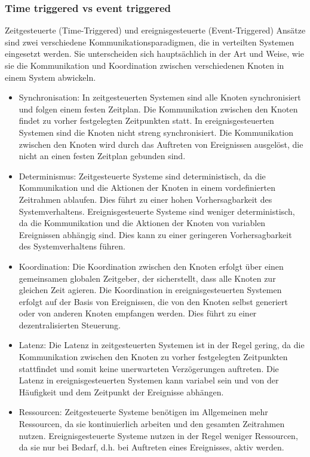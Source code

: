 \documentclass[../vs-script-first-v01.tex]{subfiles}
\begin{document}
\subsubsection{Time triggered vs event triggered}
Zeitgesteuerte (Time-Triggered) und ereignisgesteuerte (Event-Triggered) Ansätze sind zwei verschiedene Kommunikationsparadigmen, die in verteilten Systemen eingesetzt werden. Sie unterscheiden sich hauptsächlich in der Art und Weise, wie sie die Kommunikation und Koordination zwischen verschiedenen Knoten in einem System abwickeln.
\begin{itemize}
\item Synchronisation: In zeitgesteuerten Systemen sind alle Knoten synchronisiert und folgen einem festen Zeitplan. Die Kommunikation zwischen den Knoten findet zu vorher festgelegten Zeitpunkten statt. In ereignisgesteuerten Systemen sind die Knoten nicht streng synchronisiert. Die Kommunikation zwischen den Knoten wird durch das Auftreten von Ereignissen ausgelöst, die nicht an einen festen Zeitplan gebunden sind.
\item Determinismus: Zeitgesteuerte Systeme sind deterministisch, da die Kommunikation und die Aktionen der Knoten in einem vordefinierten Zeitrahmen ablaufen. Dies führt zu einer hohen Vorhersagbarkeit des Systemverhaltens. Ereignisgesteuerte Systeme sind weniger deterministisch, da die Kommunikation und die Aktionen der Knoten von variablen Ereignissen abhängig sind. Dies kann zu einer geringeren Vorhersagbarkeit des Systemverhaltens führen.
\item Koordination: Die Koordination zwischen den Knoten erfolgt über einen gemeinsamen globalen Zeitgeber, der sicherstellt, dass alle Knoten zur gleichen Zeit agieren. Die Koordination in ereignisgesteuerten Systemen erfolgt auf der Basis von Ereignissen, die von den Knoten selbst generiert oder von anderen Knoten empfangen werden. Dies führt zu einer dezentralisierten Steuerung.
\item Latenz: Die Latenz in zeitgesteuerten Systemen ist in der Regel gering, da die Kommunikation zwischen den Knoten zu vorher festgelegten Zeitpunkten stattfindet und somit keine unerwarteten Verzögerungen auftreten. Die Latenz in ereignisgesteuerten Systemen kann variabel sein und von der Häufigkeit und dem Zeitpunkt der Ereignisse abhängen.
\item Ressourcen: Zeitgesteuerte Systeme benötigen im Allgemeinen mehr Ressourcen, da sie kontinuierlich arbeiten und den gesamten Zeitrahmen nutzen. Ereignisgesteuerte Systeme nutzen in der Regel weniger Ressourcen, da sie nur bei Bedarf, d.h. bei Auftreten eines Ereignisses, aktiv werden.
\end{itemize}
\end{document}

